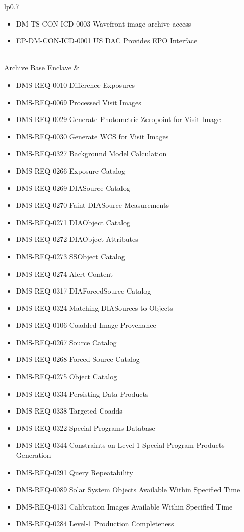 \begin{xtabular}{lp{0.7\textwidth}}
\begin{itemize}
\item DM-TS-CON-ICD-0003 Wavefront image archive access
\item EP-DM-CON-ICD-0001 US DAC Provides EPO Interface
\end{itemize} \\ \hline
Archive Base Enclave &
\begin{itemize}DMS-REQ-0004 Nightly Data Accessible Within 24 hrs
\item DMS-REQ-0010 Difference Exposures
\item DMS-REQ-0069 Processed Visit Images
\item DMS-REQ-0029 Generate Photometric Zeropoint for Visit Image
\item DMS-REQ-0030 Generate WCS for Visit Images
\item DMS-REQ-0327 Background Model Calculation
\item DMS-REQ-0266 Exposure Catalog
\item DMS-REQ-0269 DIASource Catalog
\item DMS-REQ-0270 Faint DIASource Measurements
\item DMS-REQ-0271 DIAObject Catalog
\item DMS-REQ-0272 DIAObject Attributes
\item DMS-REQ-0273 SSObject Catalog
\item DMS-REQ-0274 Alert Content
\item DMS-REQ-0317 DIAForcedSource Catalog
\item DMS-REQ-0324 Matching DIASources to Objects
\item DMS-REQ-0106 Coadded Image Provenance
\item DMS-REQ-0267 Source Catalog
\item DMS-REQ-0268 Forced-Source Catalog
\item DMS-REQ-0275 Object Catalog
\item DMS-REQ-0334 Persisting Data Products
\item DMS-REQ-0338 Targeted Coadds
\item DMS-REQ-0322 Special Programs Database
\item DMS-REQ-0344 Constraints on Level 1 Special Program Products Generation
\item DMS-REQ-0291 Query Repeatability
\item DMS-REQ-0089 Solar System Objects Available Within Specified Time
\item DMS-REQ-0131 Calibration Images Available Within Specified Time
\item DMS-REQ-0284 Level-1 Production Completeness

\end{itemize}
\end{xtabular}
